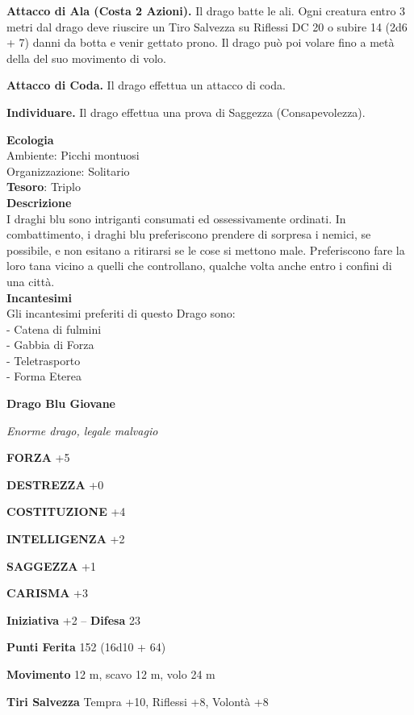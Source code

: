 \begin{multicols}{2}
	\textbf{Attacco di Ala (Costa 2 Azioni).} Il drago batte le ali. Ogni creatura entro 3 metri dal drago deve riuscire un Tiro Salvezza su Riflessi DC 20 o subire 14 (2d6 + 7) danni da botta e venir gettato prono. Il drago può poi volare fino a metà della del suo movimento di volo.

	\textbf{Attacco di Coda.} Il drago effettua un attacco di coda.

	\textbf{Individuare.} Il drago effettua una prova di Saggezza (Consapevolezza).

	\textbf{Ecologia}\\
	Ambiente: Picchi montuosi\\
	Organizzazione: Solitario\\
	\textbf{Tesoro}: Triplo\\
	\textbf{Descrizione}\\
	I draghi blu sono intriganti consumati ed ossessivamente ordinati. In combattimento, i draghi blu preferiscono prendere di sorpresa i nemici, se possibile, e non esitano a ritirarsi se le cose si mettono male. Preferiscono fare la loro tana vicino a quelli che controllano, qualche volta anche entro i confini di una città.\\
	\textbf{Incantesimi}\\
	Gli incantesimi preferiti di questo Drago sono:\\
	- Catena di fulmini\\
	- Gabbia di Forza\\
	- Teletrasporto\\
	- Forma Eterea


	\medskip{}\textbf{Drago Blu Giovane}

	\textit{Enorme drago, legale malvagio}

	\textbf{FORZA} +5

	\textbf{DESTREZZA} +0

	\textbf{COSTITUZIONE} +4

	\textbf{INTELLIGENZA} +2

	\textbf{SAGGEZZA} +1

	\textbf{CARISMA} +3

	\textbf{Iniziativa} +2 -- \textbf{Difesa} 23

	\textbf{Punti Ferita} 152 (16d10 + 64)

	\textbf{Movimento} 12 m, scavo 12 m, volo 24 m

	\textbf{Tiri Salvezza} Tempra +10, Riflessi +8, Volontà +8


\end{multicols}
